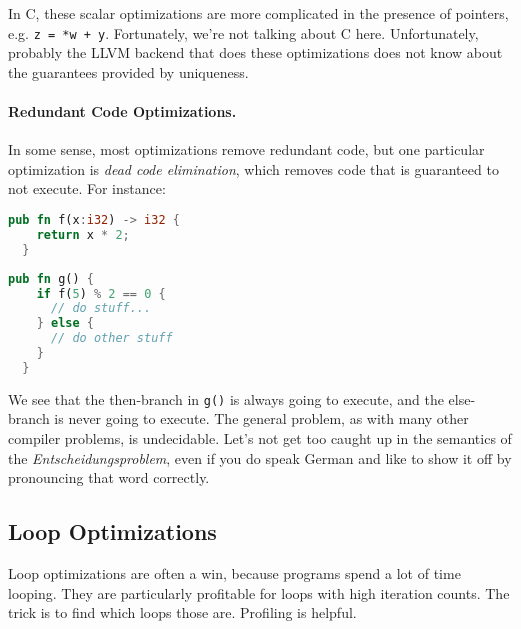 In C, these scalar optimizations are more complicated in the presence
of pointers, e.g. {\tt z = *w + y}. Fortunately, we're not talking about C here.
Unfortunately, probably the LLVM backend that does these optimizations does not know about
the guarantees provided by uniqueness.


\paragraph{Redundant Code Optimizations.} In some sense, most optimizations
remove redundant code, but one particular optimization is \emph{dead code
elimination}, which removes code that is guaranteed to not execute.
For instance:

{\scriptsize
\begin{center}
\vspace*{-2em}
\begin{minipage}{.3\textwidth}
\begin{lstlisting}[language=Rust]
  pub fn f(x:i32) -> i32 {
    return x * 2;
  }
  \end{lstlisting}
  \end{minipage} \begin{minipage}{.3\textwidth}
\begin{lstlisting}[language=Rust]
  pub fn g() {
    if f(5) % 2 == 0 {
      // do stuff...
    } else {
      // do other stuff
    }
  }
\end{lstlisting}
\end{minipage}
\end{center}
}
We see that the then-branch in {\tt g()} is always going to execute, and the
else-branch is never going to execute.
The general problem, as with many other compiler problems, is undecidable. Let's not get too caught up in the semantics of the \textit{Entscheidungsproblem}, even if you do speak German and like to show it off by pronouncing that word correctly.

\subsection*{Loop Optimizations}
Loop optimizations are often a win, because programs spend a lot of time looping. They are particularly profitable for loops with high iteration counts.
The trick is to find which loops those are.
Profiling is helpful.


